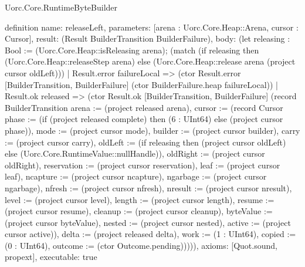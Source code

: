 \begin{lexlean}{Uorc.Core.RuntimeByteBuilder}
\begin{semanticmodule}
definition{
  name: releaseLeft,
  parameters: [arena : Uorc.Core.Heap::Arena, cursor : Cursor],
  result: (Result BuilderTransition BuilderFailure),
  body: (let releasing : Bool := (Uorc.Core.Heap::isReleasing arena); (match (if releasing then (Uorc.Core.Heap::releaseStep arena) else (Uorc.Core.Heap::release arena (project cursor oldLeft)))
    | Result.error failureLocal => (ctor Result.error [BuilderTransition, BuilderFailure] (ctor BuilderFailure.heap failureLocal))
    | Result.ok released => (ctor Result.ok [BuilderTransition, BuilderFailure] (record BuilderTransition {arena := (project released arena), cursor := (record Cursor {phase := (if (project released complete) then (6 : UInt64) else (project cursor phase)), mode := (project cursor mode), builder := (project cursor builder), carry := (project cursor carry), oldLeft := (if releasing then (project cursor oldLeft) else (Uorc.Core.RuntimeValue::nullHandle)), oldRight := (project cursor oldRight), reservation := (project cursor reservation), leaf := (project cursor leaf), ncapture := (project cursor ncapture), ngarbage := (project cursor ngarbage), nfresh := (project cursor nfresh), nresult := (project cursor nresult), level := (project cursor level), length := (project cursor length), resume := (project cursor resume), cleanup := (project cursor cleanup), byteValue := (project cursor byteValue), nested := (project cursor nested), active := (project cursor active)}), delta := (project released delta), work := (1 : UInt64), copied := (0 : UInt64), outcome := (ctor Outcome.pending)})))),
  axioms: [Quot.sound, propext],
  executable: true
}


\end{semanticmodule}
\end{lexlean}
